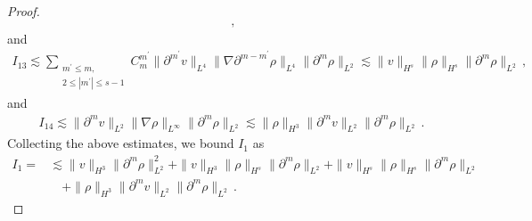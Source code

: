 \documentclass[reqno,11pt]{amsart}
\numberwithin{equation}{section}
\def\p{\partial}
\begin{document}
\begin{proof}
\begin{equation}
\begin{aligned}
        \,,
	\end{aligned}
\end{equation}
and
\begin{equation}\label{rho-eqI13}
	\begin{aligned}
		I_{13} \lesssim \sum_{\substack{m^{\prime} \leq m, \\ 2 \leq |m^{\prime}| \leq s - 1}} C_m^{m^{\prime}} \| \partial^{m^{\prime}} v \|_{L^4} \| \nabla \partial^{m - m^{\prime}} \rho \|_{L^4} \| \partial^m \rho \|_{L^2} \lesssim \| v \|_{H^s} \| \rho \|_{H^s} \| \partial^m \rho\|_{L^2}
        \,,
	\end{aligned}
\end{equation}
and
\begin{equation}\label{rho-eqI14}
	\begin{aligned}
		I_{14} \lesssim \| \partial^m v \|_{L^2} \| \nabla \rho \|_{L^\infty} \| \partial^m \rho \|_{L^2} \lesssim \| \rho \|_{H^3} \| \partial^m v \|_{L^2} \| \partial^m \rho \|_{L^2}
        \,.
	\end{aligned}
\end{equation}
Collecting the above estimates, we bound $I_1$ as
 \begin{equation}\label{rho-eq11}
	\begin{aligned}
		I_1=& \lesssim \|v\|_{H^3}\|\p^m\rho\|^2_{L^2}+\|v\|_{H^3}\|\rho\|_{H^s}\|\p^m\rho\|_{L^2}	+\|v\|_{H^s}\|\rho\|_{H^s}\|\p^m\rho\|_{L^2}\\
				&\quad+\|\rho\|_{H^3}	\|\p^m v\|_{L^2}\|\p^m\rho\|_{L^2}	\,.
	\end{aligned}
\end{equation}


\end{proof}
\end{document}
